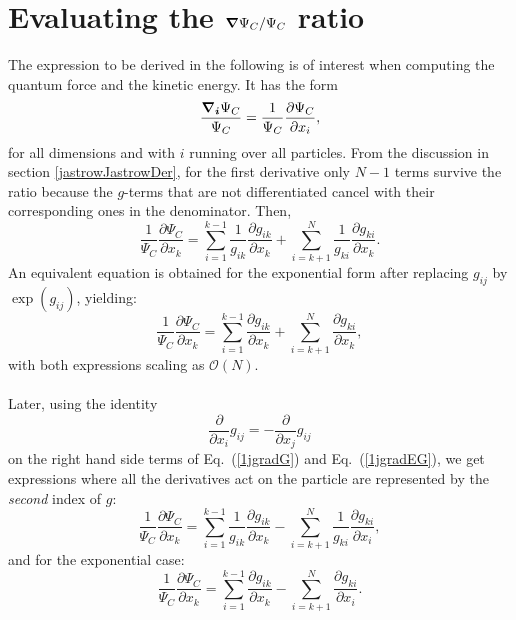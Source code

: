 \section{Evaluating the $\boldsymbol{\nabla} \Psi_C/\Psi_C$ ratio}\label{gradJastrow}
The expression to be derived in the following is of interest when computing the quantum force and the kinetic energy. It has the form
$$
\frac{\boldsymbol{{\nabla_i}}\Psi_C}{\Psi_C} = \frac{1}{\Psi_C}\frac{\partial \Psi_C}{\partial x_i},
$$
for all dimensions and with $i$ running over all particles.
From the discussion in section \ref{jastrowJastrowDer}, for the first derivative only $N-1$ terms survive the ratio because the $g$-terms that are not differentiated cancel with their corresponding ones in the denominator. Then,
\begin{equation}\label{1jgradG}
\frac{1}{\Psi_C}\frac{\partial \Psi_C}{\partial x_k} =
\sum_{i=1}^{k-1}\frac{1}{g_{ik}}\frac{\partial g_{ik}}{\partial x_k}
+
\sum_{i=k+1}^{N}\frac{1}{g_{ki}}\frac{\partial g_{ki}}{\partial x_k}.
\end{equation}
An equivalent equation is obtained for the exponential form after replacing $g_{ij}$ by $\exp(g_{ij})$, yielding:
\begin{equation}\label{1jgradEG}
\frac{1}{\Psi_C}\frac{\partial \Psi_C}{\partial x_k} =
\sum_{i=1}^{k-1}\frac{\partial g_{ik}}{\partial x_k}
+
\sum_{i=k+1}^{N}\frac{\partial g_{ki}}{\partial x_k},
\end{equation}
with both expressions scaling as $\mathcal{O}(N)$.\\
\\
\noindent
Later, using the identity 
\begin{equation}\label{firstDerIdentity}
\frac{\partial}{\partial x_i}g_{ij} = -\frac{\partial}{\partial x_j}g_{ij} 
\end{equation}
on the right hand side terms of Eq.~(\ref{1jgradG}) and Eq.~(\ref{1jgradEG}), we get expressions where all the derivatives act on the particle are represented by the
\emph{second} index of $g$:
\begin{equation}\label{gradJasGen}
\boxed{
\frac{1}{\Psi_C}\frac{\partial \Psi_C}{\partial x_k} =
\sum_{i=1}^{k-1}\frac{1}{g_{ik}}\frac{\partial g_{ik}}{\partial x_k}
-
\sum_{i=k+1}^{N}\frac{1}{g_{ki}}\frac{\partial g_{ki}}{\partial x_i},
}
\end{equation}
and for the exponential case:
\begin{equation}\label{gradJasGenExp}
\boxed{
\frac{1}{\Psi_C}\frac{\partial \Psi_C}{\partial x_k} =
\sum_{i=1}^{k-1}\frac{\partial g_{ik}}{\partial x_k}
-
\sum_{i=k+1}^{N}\frac{\partial g_{ki}}{\partial x_i}.
}
\end{equation}


